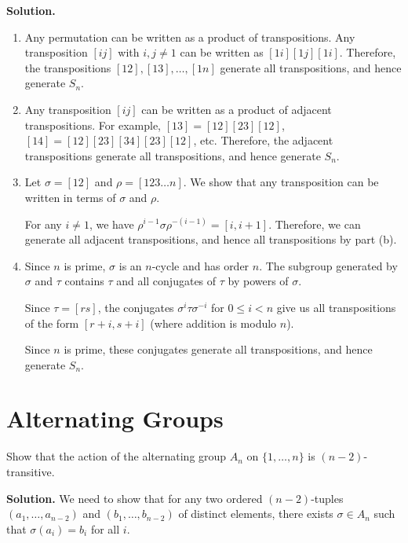 \noindent\textbf{Solution.}
\begin{enumerate}[label=(\alph*)]
\item Any permutation can be written as a product of transpositions. Any transposition $[ij]$ with $i, j \neq 1$ can be written as $[1i][1j][1i]$. Therefore, the transpositions $[12], [13], \ldots, [1n]$ generate all transpositions, and hence generate $S_n$.

\item Any transposition $[ij]$ can be written as a product of adjacent transpositions. For example, $[13] = [12][23][12]$, $[14] = [12][23][34][23][12]$, etc. Therefore, the adjacent transpositions generate all transpositions, and hence generate $S_n$.

\item Let $\sigma = [12]$ and $\rho = [123 \ldots n]$. We show that any transposition can be written in terms of $\sigma$ and $\rho$.

For any $i \neq 1$, we have $\rho^{i-1}\sigma\rho^{-(i-1)} = [i, i+1]$. Therefore, we can generate all adjacent transpositions, and hence all transpositions by part (b).

\item Since $n$ is prime, $\sigma$ is an $n$-cycle and has order $n$. The subgroup generated by $\sigma$ and $\tau$ contains $\tau$ and all conjugates of $\tau$ by powers of $\sigma$.

Since $\tau = [rs]$, the conjugates $\sigma^i\tau\sigma^{-i}$ for $0 \leq i < n$ give us all transpositions of the form $[r+i, s+i]$ (where addition is modulo $n$).

Since $n$ is prime, these conjugates generate all transpositions, and hence generate $S_n$.
\end{enumerate}

\section{Alternating Groups}

\begin{problembox}
Show that the action of the alternating group $A_n$ on $\{1, \ldots, n\}$ is $(n - 2)$-transitive.
\end{problembox}

\noindent\textbf{Solution.} We need to show that for any two ordered $(n-2)$-tuples $(a_1, \ldots, a_{n-2})$ and $(b_1, \ldots, b_{n-2})$ of distinct elements, there exists $\sigma \in A_n$ such that $\sigma(a_i) = b_i$ for all $i$.

